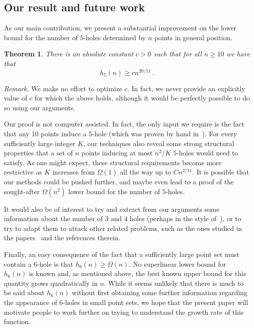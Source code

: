 \documentclass[12pt,reqno, a4paper]{amsart}
\newcounter{contSect} \numberwithin{contSect}{section}
\newtheorem{theorem}[contSect]{Theorem}
\begin{document}
\subsection{Our result and future work}

As our main contribution, we present a substantial improvement on the lower bound for the number of $5$-holes determined by $n$ points in general position.

\begin{theorem}\label{thm:main}
    There is an absolute constant $c>0$ such that for all $n\geq10$ we have that \[h_5(n)\geq cn^{20/11}\,.\]
\end{theorem}

\noindent\textit{Remark.} We make no effort to optimize $c$. In fact, we never provide an explicitly value of $c$ for which the above holds, although it would be perfectly possible to do so using our arguments. 

Our proof is not computer assisted. In fact, the only input we require is the fact that any $10$ points induce a $5$-hole (which was proven by hand in~\cite{harborth1978konvexe}). For every sufficiently large integer $K$, our techniques also reveal some strong structural properties that a set of $n$ points inducing at most $n^2/K$ $5$-holes would need to satisfy. As one might expect, these structural requirements become more restrictive as $K$ increases from $\Omega(1)$ all the way up to $Cn^{2/11}$. It is possible that our methods could be pushed further, and maybe even lead to a proof of the sought-after $\Omega(n^2)$ lower bound for the number of $5$-holes.

It would also be of interest to try and extract from our arguments some information about the number of $3$ and $4$ holes (perhaps in the style of~\cite{Garcia2012}), or to try to adapt them to attack other related problems, such as the ones studied in the papers~\cite{barany2000problems,pach2013monochromatic,aichholzer2010large,diaz2021note,bhattacharya2026number} and the references therein.

Finally, an easy consequence of the fact that a sufficiently large point set must contain a $6$-hole is that $h_6(n)\geq\Omega(n)$. No superlinear lower bound for $h_6(n)$ is known and, as mentioned above, the best known upper bound for this quantity grows quadratically in $n$. While it seems unlikely that there is much to be said about $h_6(n)$ without first obtaining some further information regarding the appearance of $6$-holes in small point sets, we hope that the present paper will motivate people to work further on trying to understand the growth rate of this function.
\end{document}
